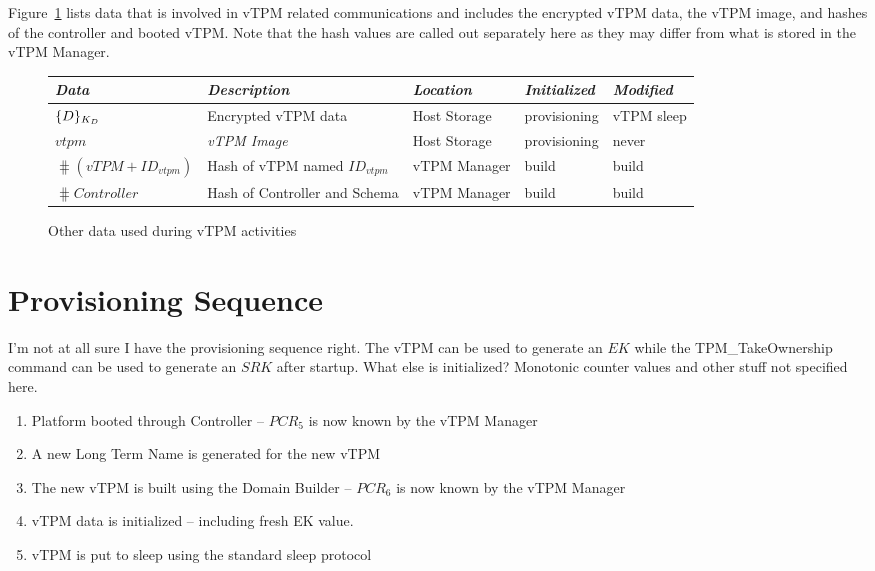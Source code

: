 \documentclass[10pt]{article}
\begin{document}
Figure~\ref{fig:other-data} lists data that is involved in vTPM
related communications and includes the encrypted vTPM data, the vTPM
image, and hashes of the controller and booted vTPM.  Note that the
hash values are called out separately here as they may differ from
what is stored in the vTPM Manager.

\begin{figure}[hbtp]
  \centering
  \begin{tabular}{lllll}
    \emph{Data} & \emph{Description} & \emph{Location} &
    \emph{Initialized} & \emph{Modified} \\ \hline
    $\{D\}_{K_D}$ & Encrypted vTPM data & Host Storage &
    provisioning & vTPM sleep \\
    $vtpm$ & \emph{vTPM Image} & Host Storage & provisioning & never
    \\
    $\hash{(vTPM+ID_{vtpm})}$ & Hash of vTPM named $ID_{vtpm}$ & vTPM
    Manager & build & build \\ 
    $\hash{Controller}$ & Hash of Controller and Schema & vTPM
    Manager & build & build \\ 
  \end{tabular}
  \caption{Other data used during vTPM activities}
  \label{fig:other-data}
\end{figure}

\section{Provisioning Sequence}

I'm not at all sure I have the provisioning sequence right.  The vTPM
can be used to generate an $EK$ while the \textsf{TPM\_TakeOwnership}
command can be used to generate an $SRK$ after startup.  What else is
initialized?  Monotonic counter values and other stuff not specified here.

\begin{enumerate}
\item Platform booted through Controller -- $PCR_5$ is now known by
  the vTPM Manager
\item A new Long Term Name is generated for the new vTPM
\item The new vTPM is built using the Domain Builder -- $PCR_6$ is now
  known by the vTPM Manager
\item vTPM data is initialized -- including fresh EK value.
\item vTPM is put to sleep using the standard sleep protocol
\end{enumerate}
\end{document}
